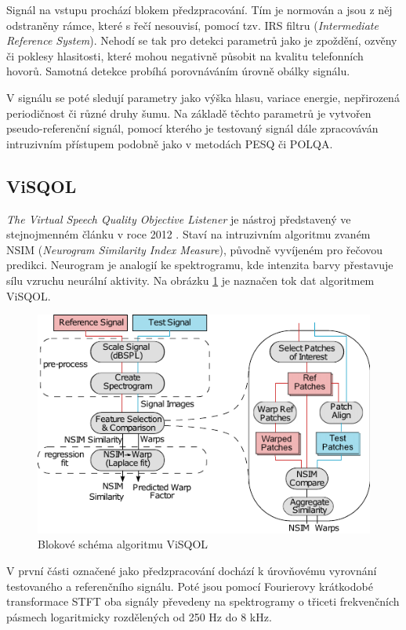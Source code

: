     Signál na vstupu prochází blokem předzpracování. Tím je normován a jsou z něj odstraněny rámce, které s řečí nesouvisí, pomocí tzv. IRS filtru (\textit{Intermediate Reference System}). Nehodí se tak pro detekci parametrů jako je zpoždění, ozvěny či poklesy hlasitosti, které mohou negativně působit na kvalitu telefonních hovorů. Samotná detekce probíhá porovnáváním úrovně obálky signálu.
    
    V signálu se poté sledují parametry jako výška hlasu, variace energie, nepřirozená periodičnost či různé druhy šumu. Na základě těchto parametrů je vytvořen pseudo-referenční signál, pomocí kterého je testovaný signál dále zpracováván intruzivním přístupem podobně jako v metodách PESQ či POLQA.
    

\subsection{ViSQOL}
\label{subchapter:visqol}

\textit{The Virtual Speech Quality Objective Listener} je nástroj představený ve stejnojmenném článku v roce 2012 \cite{article:visqol}. Staví na intruzivním algoritmu zvaném NSIM (\textit{Neurogram Similarity Index Measure}), původně vyvíjeném pro řečovou predikci. Neurogram je analogií ke spektrogramu, kde intenzita barvy přestavuje sílu vzruchu neurální aktivity. Na obrázku \ref{pic:visqol} je naznačen tok dat algoritmem ViSQOL.

\begin{figure}[h]
    \centering
    \includegraphics[width = .7\textwidth]{pic/visqol.pdf}
    \caption{Blokové schéma algoritmu ViSQOL\cite{article:visqol}}
    \label{pic:visqol}
\end{figure}

V první části označené jako předzpracování dochází k úrovňovému vyrovnání testovaného a referenčního signálu. Poté jsou pomocí Fourierovy krátkodobé transformace STFT oba signály převedeny na spektrogramy o třiceti frekvenčních pásmech logaritmicky rozdělených od 250 Hz do 8 kHz.

